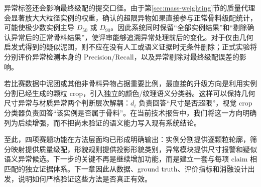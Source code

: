 异常标签还会影响最终级配的提交口径。由于第\ref{sec:mass-weighting}节的质量代理会显著放大大粒径实例的权重，确认的超限异物如果直接参与正常骨料级配统计，可能使极少数实例主导 $D_{50}$ 或 $D_{90}$。因此系统同时保留“全部实例结果”和“剔除确认异常后的正常骨料结果”，使评审能够追溯异常处理前后的变化。对于仅由几何启发式得到的疑似泥团，则不应在没有人工或语义证据时无条件删除；正式实验将分别评价异常检测本身的 Precision/Recall，以及异常剔除对最终级配误差的影响。

若比赛数据中泥团或其他非骨料异物占据重要比例，最直接的升级方向是利用实例分割已经生成的颗粒 crop，引入独立的颜色/纹理语义分类器。这样可以保持几何尺寸异常与材质异常两个判断层次解耦：$d_i$ 负责回答“尺寸是否超限”，视觉 crop 分类器负责回答“该实例是否属于骨料”。在当前技术报告中，我们将这一方向明确列为后续增强，而不把尚未验证的语义能力写入现有系统结论。

至此，四项赛题功能在方法层面均已形成明确输出：实例分割提供逐颗粒轮廓，筛分映射提供质量级配，形貌规则提供投影形貌类别，异常模块提供尺寸报警和疑似语义异常候选。下一步的关键不再是继续增加功能，而是建立一套与每项 claim 相匹配的独立证据体系。下一章因此从数据、ground truth、评价指标和消融设计出发，说明如何严格验证这些方法是否真正有效。